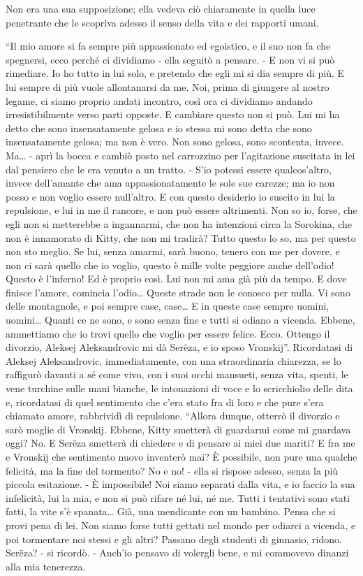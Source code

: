 Non era una sua supposizione; ella vedeva ciò chiaramente in quella luce penetrante che le scopriva adesso il senso della vita e dei rapporti umani. 

``Il mio amore si fa sempre più appassionato ed egoistico, e il suo non fa che spegnersi, ecco perché ci dividiamo - ella seguitò a pensare. - E non vi si può rimediare. Io ho tutto in lui solo, e pretendo che egli mi si dia sempre di più. E lui sempre di più vuole allontanarsi da me. Noi, prima di giungere al nostro legame, ci siamo proprio andati incontro, così ora ci dividiamo andando irresistibilmente verso parti opposte. E cambiare questo non si può. Lui mi ha detto che sono insensatamente gelosa e io stessa mi sono detta che sono insensatamente gelosa; ma non è vero. Non sono gelosa, sono scontenta, invece. Ma\ldots{} - aprì la bocca e cambiò posto nel carrozzino per l'agitazione suscitata in lei dal pensiero che le era venuto a un tratto. - S'io potessi essere qualcos'altro, invece dell'amante che ama appassionatamente le sole sue carezze; ma io non posso e non voglio essere null'altro. E con questo desiderio io suscito in lui la repulsione, e lui in me il rancore, e non può essere altrimenti. Non so io, forse, che egli non si metterebbe a ingannarmi, che non ha intenzioni circa la Sorokina, che non è innamorato di Kitty, che non mi tradirà? Tutto questo lo so, ma per questo non sto meglio. Se lui, senza amarmi, sarà buono, tenero con me per dovere, e non ci sarà quello che io voglio, questo è mille volte peggiore anche dell'odio! Questo è l'inferno! Ed è proprio così. Lui non mi ama già più da tempo. E dove finisce l'amore, comincia l'odio\ldots{} Queste strade non le conosco per nulla. Vi sono delle montagnole, e poi sempre case, case\ldots{} E in queste case sempre uomini, uomini\ldots{} Quanti ce ne sono, e sono senza fine e tutti si odiano a vicenda. Ebbene, ammettiamo che io trovi quello che voglio per essere felice. Ecco. Ottengo il divorzio, Aleksej Aleksandrovic mi dà Serëza, e io sposo Vronskij''. Ricordatasi di Aleksej Aleksandrovic, immediatamente, con una straordinaria chiarezza, se lo raffigurò davanti a sé come vivo, con i suoi occhi mansueti, senza vita, spenti, le vene turchine sulle mani bianche, le intonazioni di voce e lo scricchiolio delle dita e, ricordatasi di quel sentimento che c'era stato fra di loro e che pure s'era chiamato amore, rabbrividì di repulsione. ``Allora dunque, otterrò il divorzio e sarò moglie di Vronskij. Ebbene, Kitty smetterà di guardarmi come mi guardava oggi? No. E Serëza smetterà di chiedere e di pensare ai miei due mariti? E fra me e Vronskij che sentimento nuovo inventerò mai? È possibile, non pure una qualche felicità, ma la fine del tormento? No e no! - ella si rispose adesso, senza la più piccola esitazione. - È impossibile! Noi siamo separati dalla vita, e io faccio la sua infelicità, lui la mia, e non si può rifare né lui, né me. Tutti i tentativi sono stati fatti, la vite s'è spanata\ldots{} Già, una mendicante con un bambino. Pensa che si provi pena di lei. Non siamo forse tutti gettati nel mondo per odiarci a vicenda, e poi tormentare noi stessi e gli altri? Passano degli studenti di ginnasio, ridono. Serëza? - si ricordò. - Anch'io pensavo di volergli bene, e mi commovevo dinanzi alla mia tenerezza. 